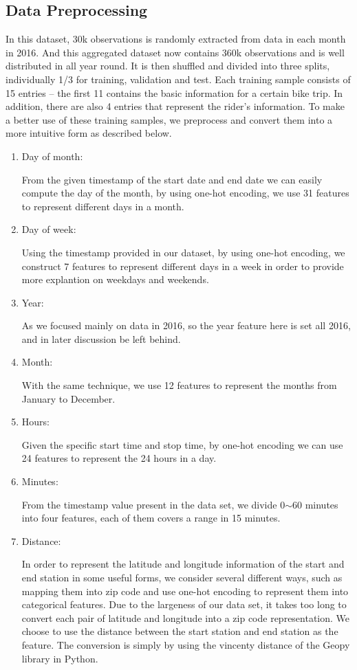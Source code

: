 \subsection{Data Preprocessing}
\par In this dataset, 30k observations is randomly extracted from data in each month in 2016. And this aggregated dataset now contains 360k observations and is well distributed in all year round. It is then shuffled and divided into three splits, individually 1/3 for training, validation and test. Each training sample consists of 15 entries -- the first 11 contains the basic information for a certain bike trip. In addition, there are also 4 entries that represent the rider's information. To make a better use of these training samples, we preprocess and convert them into a more intuitive form as described below.
\begin{enumerate}
	\item Day of month:
	\par From the given timestamp of the start date and end date we can easily compute the day of the month, by using one-hot encoding, we use 31 features to represent different days in a month. 
	\item Day of week:
	\par Using the timestamp provided in our dataset, by using one-hot encoding, we construct 7 features to represent different days in a week in order to provide more explantion on weekdays and weekends.
	\item Year:
	\par As we focused mainly on data in 2016, so the year feature here is set all 2016, and in later discussion be left behind.
	\item Month:
	\par With the same technique, we use 12 features to represent the months from January to December.
	\item Hours:
	\par Given the specific start time and stop time, by one-hot encoding we can use 24 features to represent the 24 hours in a day.
	\item Minutes:
	\par From the timestamp value present in the data set, we divide 0$\sim$60 minutes into four features, each of them covers a range in 15 minutes.
	\item Distance:
	\par In order to represent the latitude and longitude information of the start and end station in some useful forms, we consider several different ways, such as mapping them into zip code and use one-hot encoding to represent them into categorical features. Due to the largeness of our data set, it takes too long to convert each pair of latitude and longitude into a zip code representation. We choose to use the distance between the start station and end station as the feature. The  conversion is simply by using the vincenty distance of the Geopy library in Python\cite{geopy}. 

\end{enumerate}
